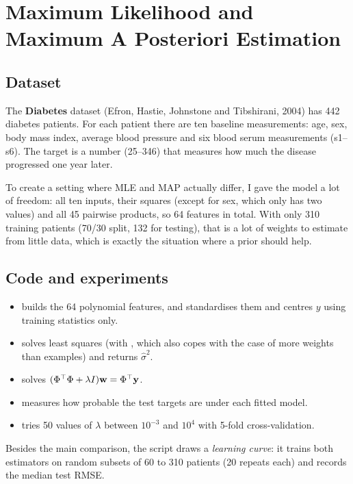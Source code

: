 \chapter[Maximum Likelihood and Maximum A Posteriori Estimation]{Maximum Likelihood and\\Maximum A Posteriori Estimation}


\section{Dataset}
The \textbf{Diabetes} dataset (Efron, Hastie, Johnstone and Tibshirani, 2004) has 442 diabetes patients.
For each patient there are ten baseline measurements: age, sex, body mass index, average blood pressure
and six blood serum measurements (s1--s6). The target is a number (25--346) that measures how much the
disease progressed one year later.

To create a setting where MLE and MAP actually differ, I gave the model a lot of freedom: all ten
inputs, their squares (except for sex, which only has two values) and all 45 pairwise products, so
64 features in total. With only 310 training patients (70/30 split, 132 for testing), that is a lot of
weights to estimate from little data, which is exactly the situation where a prior should help.

\section{Code and experiments}
\begin{itemize}
\item {} builds the 64 polynomial features, and  standardises them and centres $y$
      using training statistics only.
\item {} solves least squares (with , which also copes with the case
      of more weights than examples) and returns $\hat\sigma^2$.
\item {} solves $(\Phi^\top\Phi+\lambda I)\mathbf{w}=\Phi^\top\mathbf{y}$.
\item {} measures how probable the test targets are under each fitted model.
\item {} tries 50 values of $\lambda$ between $10^{-3}$ and $10^{4}$ with 5-fold
      cross-validation.
\end{itemize}
\noindent Besides the main comparison, the script draws a \emph{learning curve}: it trains both
estimators on random subsets of 60 to 310 patients (20 repeats each) and records the median test RMSE.

